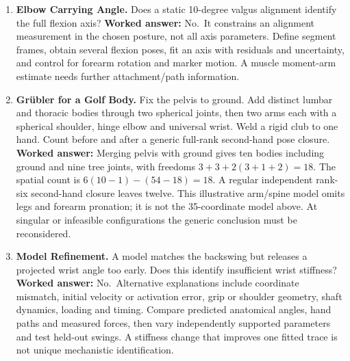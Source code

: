 \begin{enumerate}
\item
  \textbf{Elbow Carrying Angle.} Does a static 10-degree valgus alignment identify the full flexion axis? \textbf{Worked answer:} No.~It constrains an alignment measurement in the chosen posture, not all axis parameters. Define segment frames, obtain several flexion poses, fit an axis with residuals and uncertainty, and control for forearm rotation and marker motion. A muscle moment-arm estimate needs further attachment/path information.
\item
  \textbf{Grübler for a Golf Body.} Fix the pelvis to ground. Add distinct lumbar and thoracic bodies through two spherical joints, then two arms each with a spherical shoulder, hinge elbow and universal wrist. Weld a rigid club to one hand. Count before and after a generic full-rank second-hand pose closure. \textbf{Worked answer:} Merging pelvis with ground gives ten bodies including ground and nine tree joints, with freedoms \(3+3+2(3+1+2)=18\). The spatial count is \(6(10-1)-(54-18)=18\). A regular independent rank-six second-hand closure leaves twelve. This illustrative arm/spine model omits legs and forearm pronation; it is not the 35-coordinate model above. At singular or infeasible configurations the generic conclusion must be reconsidered.
\item
  \textbf{Model Refinement.} A model matches the backswing but releases a projected wrist angle too early. Does this identify insufficient wrist stiffness? \textbf{Worked answer:} No.~Alternative explanations include coordinate mismatch, initial velocity or activation error, grip or shoulder geometry, shaft dynamics, loading and timing. Compare predicted anatomical angles, hand paths and measured forces, then vary independently supported parameters and test held-out swings. A stiffness change that improves one fitted trace is not unique mechanistic identification.
\end{enumerate}
